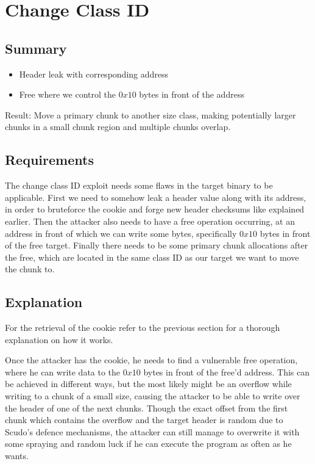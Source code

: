 \documentclass[a4paper,11pt,oneside]{report}
\begin{document}
\section{Change Class ID}

\subsection{Summary}

\begin{itemize}
\item Header leak with corresponding address
\item Free where we control the $0x10$ bytes in front of the address
\end{itemize}

Result:
Move a primary chunk to another size class, making potentially larger chunks in a small
chunk region and multiple chunks overlap.

\subsection{Requirements}

The change class ID exploit needs some flaws in the target binary to be applicable.
First we need to somehow leak a header value along with its address, in order to
bruteforce the cookie and forge new header checksums like explained earlier. Then the
attacker also needs to have a free operation occurring, at an address in front of which
we can write some bytes, specifically $0x10$ bytes in front of the free target. Finally
there needs to be some primary chunk allocations after the free, which are located in
the same class ID as our target we want to move the chunk to.

\subsection{Explanation}

For the retrieval of the cookie refer to the previous section for a thorough explanation
on how it works.

Once the attacker has the cookie, he needs to find a vulnerable free operation, where
he can write data to the $0x10$ bytes in front of the free'd address. This can be
achieved in different ways, but the most likely might be an overflow while writing to
a chunk of a small size, causing the attacker to be able to write over the header of one
of the next chunks. Though the exact offset from the first chunk which contains the
overflow and the target header is random due to Scudo's defence mechanisms, the attacker
can still manage to overwrite it with some spraying and random luck if he can execute the
program as often as he wants.
\end{document}
